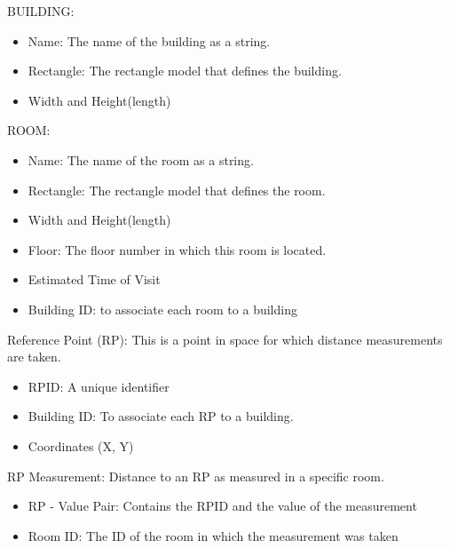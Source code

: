 BUILDING:
\begin{itemize}
	\item Name: The name of the building as a string.
	\item Rectangle: The rectangle model that defines the building.
	\item Width and Height(length)
\end{itemize}


ROOM: 
\begin{itemize}
	\item Name: The name of the room as a string.
	\item Rectangle: The rectangle model that defines the room.
	\item Width and Height(length)
	\item Floor: The floor number in which this room is located.
	\item Estimated Time of Visit
	\item Building ID: to associate each room to a building
\end{itemize}

Reference Point (RP): This is a point in space for which distance measurements are taken.
\begin{itemize}
	\item RPID: A unique identifier
	\item Building ID: To associate each RP to a building.
	\item Coordinates (X, Y)
\end{itemize}

RP Measurement: Distance to an RP as measured in a specific room.
\begin{itemize}
	\item RP - Value Pair: Contains the RPID and the value of the measurement
	\item Room ID: The ID of the room in which the measurement was taken
\end{itemize}

